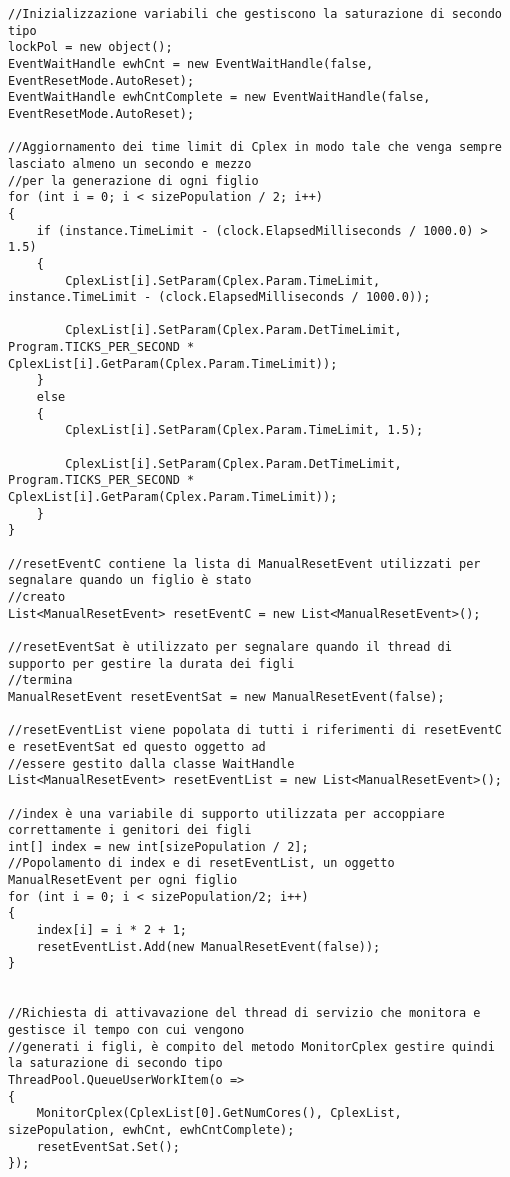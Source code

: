 \documentclass[11pt]{article}
\begin{document}
\begin{lstlisting}
//Inizializzazione variabili che gestiscono la saturazione di secondo tipo
lockPol = new object();
EventWaitHandle ewhCnt = new EventWaitHandle(false, EventResetMode.AutoReset);
EventWaitHandle ewhCntComplete = new EventWaitHandle(false, EventResetMode.AutoReset);

//Aggiornamento dei time limit di Cplex in modo tale che venga sempre lasciato almeno un secondo e mezzo
//per la generazione di ogni figlio
for (int i = 0; i < sizePopulation / 2; i++)
{
    if (instance.TimeLimit - (clock.ElapsedMilliseconds / 1000.0) > 1.5)
    {
        CplexList[i].SetParam(Cplex.Param.TimeLimit, instance.TimeLimit - (clock.ElapsedMilliseconds / 1000.0));
        
        CplexList[i].SetParam(Cplex.Param.DetTimeLimit, Program.TICKS_PER_SECOND * CplexList[i].GetParam(Cplex.Param.TimeLimit));
    }
    else
    {
        CplexList[i].SetParam(Cplex.Param.TimeLimit, 1.5);
        
        CplexList[i].SetParam(Cplex.Param.DetTimeLimit, Program.TICKS_PER_SECOND * CplexList[i].GetParam(Cplex.Param.TimeLimit));
    }
}

//resetEventC contiene la lista di ManualResetEvent utilizzati per segnalare quando un figlio è stato
//creato
List<ManualResetEvent> resetEventC = new List<ManualResetEvent>();

//resetEventSat è utilizzato per segnalare quando il thread di supporto per gestire la durata dei figli
//termina
ManualResetEvent resetEventSat = new ManualResetEvent(false);

//resetEventList viene popolata di tutti i riferimenti di resetEventC e resetEventSat ed questo oggetto ad
//essere gestito dalla classe WaitHandle
List<ManualResetEvent> resetEventList = new List<ManualResetEvent>();

//index è una variabile di supporto utilizzata per accoppiare correttamente i genitori dei figli
int[] index = new int[sizePopulation / 2];
//Popolamento di index e di resetEventList, un oggetto ManualResetEvent per ogni figlio
for (int i = 0; i < sizePopulation/2; i++)
{
    index[i] = i * 2 + 1;
    resetEventList.Add(new ManualResetEvent(false));
}


//Richiesta di attivavazione del thread di servizio che monitora e gestisce il tempo con cui vengono 
//generati i figli, è compito del metodo MonitorCplex gestire quindi la saturazione di secondo tipo
ThreadPool.QueueUserWorkItem(o =>
{
    MonitorCplex(CplexList[0].GetNumCores(), CplexList, sizePopulation, ewhCnt, ewhCntComplete);
    resetEventSat.Set();
});


\end{lstlisting}
\end{document}
